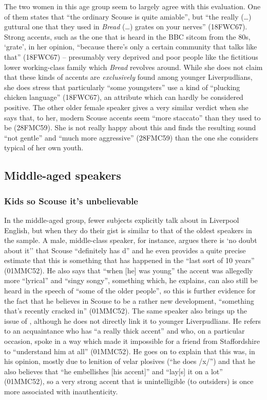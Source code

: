 The two women in this age group seem to largely agree with this evaluation.
One of them states that ``the ordinary Scouse is quite amiable'', but ``the really (\ldots) guttural one that they used in \emph{Bread} (\ldots) grates on your nerves'' (18FWC67).
Strong accents, such as the one that is heard in the BBC sitcom from the 80s, `grate', in her opinion, ``because there's only a certain community that talks like that'' (18FWC67) -- presumably very deprived and poor people like the fictitious lower working-class family which \emph{Bread} revolves around.
While she does not claim that these kinds of accents are \emph{exclusively} found among younger Liverpudlians, she does stress that particularly ``some youngsters'' use a kind of ``plucking chicken language'' (18FWC67), an attribute which can hardly be considered positive.
The other older female speaker gives a very similar verdict when she says that, to her, modern Scouse accents seem ``more staccato'' than they used to be (28FMC59).
She is not really happy about this and finds the resulting sound ``not gentle'' and ``much more aggressive'' (28FMC59) than the one she considers typical of her own youth.

\subsection{Middle-aged speakers}
\label{aware_res.eval.mid}

\subsubsection{Kids so Scouse it's unbelievable}
\label{aware_res.eval.mid.change}

In the middle-aged group, fewer subjects explicitly talk about  in Liverpool English, but when they do their gist is similar to that of the oldest speakers in the sample.
A male, middle-class speaker, for instance, argues there is `no doubt about it'' that Scouse ``definitely has d'' and he even provides a quite precise estimate that this is something that has happened in the ``last sort of 10 years'' (01MMC52).
He also says that ``when [he] was young'' the accent was allegedly more ``lyrical'' and ``singy songy'', something which, he explains, can also still be heard in the speech of ``some of the older people'', so this is further evidence for the fact that he believes  in Scouse to be a rather new development, ``something that's recently cracked in'' (01MMC52).
The same speaker also brings up the issue of , although he does not directly link it to younger Liverpudlians.
He refers to an acquaintance who has ``a really thick accent'' and who, on a particular occasion, spoke in a way which made it impossible for a friend from Staffordshire to ``understand him at all'' (01MMC52).
He goes on to explain that this was, in his opinion, mostly due to lenition of velar plosives (``he does /x/'') and that he also believes that ``he embellishes [his accent]'' and ``lay[s] it on a lot'' (01MMC52), so a very strong accent that is unintelligible (to outsiders) is once more associated with inauthenticity.

